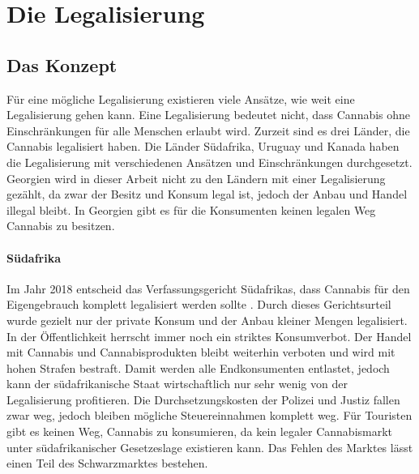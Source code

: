 \documentclass[../main.tex]{subfiles}
\begin{document}
	 \section{Die Legalisierung}
	 
	 \subsection{Das Konzept}
	 Für eine mögliche Legalisierung existieren viele Ansätze, wie weit eine Legalisierung gehen kann.
	 Eine Legalisierung bedeutet nicht, dass Cannabis ohne Einschränkungen für alle Menschen erlaubt wird.
	 Zurzeit sind es drei Länder, die Cannabis legalisiert haben.
	 Die Länder Südafrika, Uruguay und Kanada haben die Legalisierung mit verschiedenen Ansätzen und Einschränkungen durchgesetzt.
	 Georgien wird in dieser Arbeit nicht zu den Ländern mit einer Legalisierung gezählt, da zwar der Besitz und Konsum legal ist, jedoch der Anbau und Handel illegal bleibt. 
	 In Georgien gibt es für die Konsumenten keinen legalen Weg Cannabis zu besitzen.
	 
	 \paragraph{Südafrika}
	 Im Jahr 2018 entscheid das Verfassungsgericht Südafrikas, dass Cannabis für den Eigengebrauch komplett legalisiert werden sollte \cite{zacc}. 
	 Durch dieses Gerichtsurteil wurde gezielt nur der private Konsum und der Anbau kleiner Mengen legalisiert. 
	 In der Öffentlichkeit herrscht immer noch ein striktes Konsumverbot. 
	 Der Handel mit Cannabis und Cannabisprodukten bleibt weiterhin verboten und wird mit hohen Strafen bestraft. 
	 Damit werden alle Endkonsumenten entlastet, jedoch kann der südafrikanische Staat wirtschaftlich nur sehr wenig von der Legalisierung profitieren. 
	 Die Durchsetzungskosten der Polizei und Justiz fallen zwar weg, jedoch bleiben mögliche Steuereinnahmen komplett weg.
	 Für Touristen gibt es keinen Weg, Cannabis zu konsumieren, da kein legaler Cannabismarkt unter südafrikanischer Gesetzeslage existieren kann.
	 Das Fehlen des Marktes lässt einen Teil des Schwarzmarktes bestehen.
	 
\end{document}
